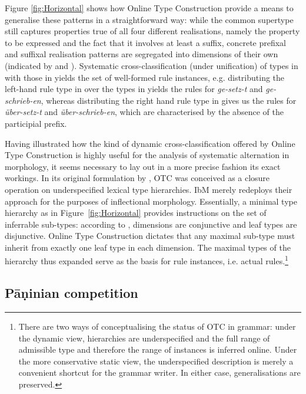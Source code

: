 Figure \ref{fig:Horizontal} shows how Online Type Construction provide
a means to generalise these patterns in a straightforward way: while the
common supertype still captures properties true of all four different
realisations, namely the property to be expressed and the fact that it
involves at least a suffix, concrete prefixal and suffixal realisation
patterns are segregated into dimensions of their own (indicated by
 and ). Systematic cross-classification
(under unification) of types in  with those in
 yields the set of well-formed rule instances,
e.g. distributing the left-hand rule type in  over the
types in  yields the rules for \textit{ge-setz-t} and
\textit{ge-schrieb-en}, whereas distributing the right hand rule type
in  gives us the rules for \textit{über-setz-t} and
\textit{über-schrieb-en}, which are characterised by the absence of
the participial prefix.

Having illustrated how the kind of dynamic cross-classification
offered by Online Type Construction is highly useful for the analysis
of systematic alternation in morphology, it seems necessary to lay out
in a more precise fashion its exact workings. In its original
formulation by \citet{Koenig94,Koenig99}, OTC was conceived as a
closure operation on underspecified lexical type hierarchies. IbM
merely redeploys their approach for the purposes of inflectional
morphology. Essentially, a minimal type hierarchy as in
Figure~\ref{fig:Horizontal} provides instructions on the set of
inferrable sub-types: according to \citet{Koenig94}, dimensions are
conjunctive and leaf types are disjunctive. Online Type Construction
dictates that any maximal sub-type must inherit from exactly one leaf
type in each dimension. The maximal types of the hierarchy thus
expanded serve as the basis for rule instances, i.e. actual
rules.\footnote{\label{fn:OTC}There are two ways of conceptualising the status of
  OTC in grammar: under the dynamic view, hierarchies are
  underspecified and the full range of admissible type and therefore
  the range of instances is inferred online. Under the more
  conservative static view, the underspecified description is merely a
  convenient shortcut for the grammar writer. In either case,
  generalisations are preserved.   
   }



\subsection{Pāṇinian competition}
\label{sec:Panini}

